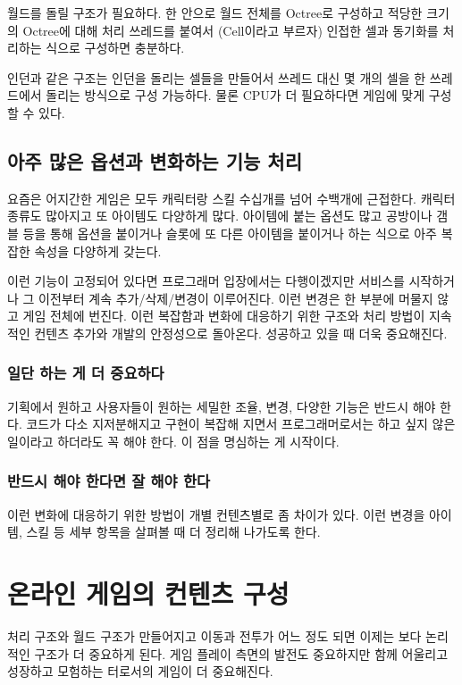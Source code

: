 \documentclass[chapter,kosection, 10.5pt, romanfixed, a4paper]{oblivoir}
\begin{document}
월드를 돌릴 구조가 필요하다. 한 안으로 월드 전체를 Octree로 구성하고 적당한 크기의 Octree에 대해 
처리 쓰레드를 붙여서 (Cell이라고 부르자) 인접한 셀과 동기화를 처리하는 식으로 구성하면 충분하다. 

인던과 같은 구조는 인던을 돌리는 셀들을 만들어서 쓰레드 대신 몇 개의 셀을 한 쓰레드에서 돌리는 방식으로
구성 가능하다. 물론 CPU가 더 필요하다면 게임에 맞게 구성할 수 있다. 

\subsection{아주 많은 옵션과 변화하는 기능 처리}

요즘은 어지간한 게임은 모두 캐릭터랑 스킬 수십개를 넘어 수백개에 근접한다. 캐릭터 종류도 많아지고
또 아이템도 다양하게 많다. 아이템에 붙는 옵션도 많고 공방이나 갬블 등을 통해 옵션을 붙이거나 
슬롯에 또 다른 아이템을 붙이거나 하는 식으로 아주 복잡한 속성을 다양하게 갖는다. 

이런 기능이 고정되어 있다면 프로그래머 입장에서는 다행이겠지만 서비스를 시작하거나 그 이전부터 
계속 추가/삭제/변경이 이루어진다. 이런 변경은 한 부분에 머물지 않고 게임 전체에 번진다. 이런 복잡함과 
변화에 대응하기 위한 구조와 처리 방법이 지속적인 컨텐츠 추가와 개발의 안정성으로 돌아온다. 성공하고 
있을 때 더욱 중요해진다. 

\subsubsection{일단 하는 게 더 중요하다}

기획에서 원하고 사용자들이 원하는 세밀한 조율, 변경, 다양한 기능은 반드시 해야 한다. 코드가 다소 지저분해지고
구현이 복잡해 지면서 프로그래머로서는 하고 싶지 않은 일이라고 하더라도 꼭 해야 한다. 이 점을 명심하는 게 
시작이다. 

\subsubsection{반드시 해야 한다면 잘 해야 한다}

이런 변화에 대응하기 위한 방법이 개별 컨텐츠별로 좀 차이가 있다. 이런 변경을 아이템, 스킬 등 세부 항목을 
살펴볼 때 더 정리해 나가도록 한다.  


\section{온라인 게임의 컨텐츠 구성}

처리 구조와 월드 구조가 만들어지고 이동과 전투가 어느 정도 되면 이제는 보다 논리적인 구조가 더 중요하게 된다. 
게임 플레이 측면의 발전도 중요하지만 함께 어울리고 성장하고 모험하는 터로서의 게임이 더 중요해진다. 
\end{document}
